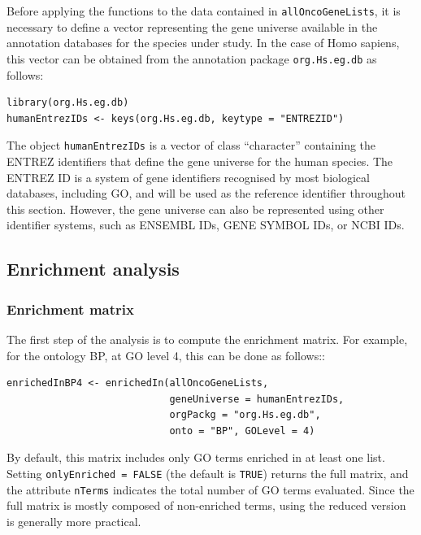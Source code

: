Before applying the  functions to the data contained in \texttt{allOncoGeneLists}, it is necessary to define a vector representing the gene universe available in the annotation databases for the species under study. In the case of Homo sapiens, this vector can be obtained from the annotation package \texttt{org.Hs.eg.db} as follows:

\begin{verbatim}
library(org.Hs.eg.db)
humanEntrezIDs <- keys(org.Hs.eg.db, keytype = "ENTREZID")
\end{verbatim}

The object \texttt{humanEntrezIDs} is a vector of class ``character'' containing the ENTREZ identifiers that define the gene universe for the human species. The ENTREZ ID is a system of gene identifiers recognised by most biological databases, including GO, and will be used as the reference identifier throughout this section. However, the gene universe can also be represented using other identifier systems, such as ENSEMBL IDs, GENE SYMBOL IDs, or NCBI IDs.

\hypertarget{enrichment-analysis}{%
\subsection{Enrichment analysis}\label{enrichment-analysis}}

\hypertarget{enrichment-matrix}{%
\subsubsection{Enrichment matrix}\label{enrichment-matrix}}

The first step of the analysis is to compute the enrichment matrix. For example, for the ontology BP, at GO level 4, this can be done as follows::

\begin{verbatim}
enrichedInBP4 <- enrichedIn(allOncoGeneLists, 
                            geneUniverse = humanEntrezIDs, 
                            orgPackg = "org.Hs.eg.db", 
                            onto = "BP", GOLevel = 4) 
\end{verbatim}

By default, this matrix includes only GO terms enriched in at least one list. Setting \texttt{onlyEnriched\ =\ FALSE} (the default is \texttt{TRUE}) returns the full matrix, and the attribute \texttt{nTerms} indicates the total number of GO terms evaluated. Since the full matrix is mostly composed of non-enriched terms, using the reduced version is generally more practical.

